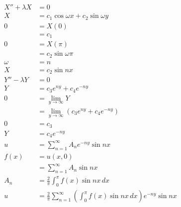 \documentclass{article}
\begin{document}
\begin{align*}
  X'' + \lambda X & = 0                                                                                                 \\
  X               & = c_1 \cos \omega x + c_2 \sin \omega y                                                             \\
  0               & = X(0)                                                                                              \\
                  & = c_1                                                                                               \\
  0               & = X(\pi)                                                                                            \\
                  & = c_2 \sin \omega \pi                                                                               \\
  \omega          & = n                                                                                                 \\
  X               & = c_2 \sin n x                                                                                      \\
  Y'' - \lambda Y & = 0                                                                                                 \\
  Y               & = c_3 e^{n y} + c_4 e^{-n y}                                                                        \\
  0               & = \lim_{y \rightarrow \infty} Y                                                                     \\
                  & = \lim_{y \rightarrow \infty} (c_3 e^{n y} + c_4 e^{-n y})                                          \\
  0               & = c_3                                                                                               \\
  Y               & = c_4 e^{-n y}                                                                                      \\
  u               & = \sum_{n = 1}^\infty A_n e^{-n y} \sin n x                                                         \\
  f(x)            & = u(x, 0)                                                                                           \\
                  & = \sum_{n = 1}^\infty A_n \sin n x                                                                  \\
  A_n             & = \frac{2}{\pi} \int_0^\pi f(x) \sin n x \,d x                                                      \\
  u               & = \frac{2}{\pi} \sum_{n = 1}^\infty \left( \int_0^\pi f(x) \sin n x \,d x \right) e^{-n y} \sin n x
\end{align*}
\end{document}
